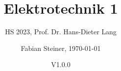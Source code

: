 \documentclass[fontsize=8pt, a4paper, fleqn, landscape, DIV=calc]{scrartcl}
\title{\vspace{-1cm}Elektrotechnik 1}
\subtitle{HS 2023, Prof. Dr. Hans-Dieter Lang}
\author{Fabian Steiner, \today}
\date{{\small V1.0.0}}
\begin{document}
	\begin{multicols*}{2}
        \begin{minipage}{0.75\columnwidth}
		      \maketitle
        \end{minipage}
        \begin{minipage}{0.2\columnwidth}
            \begin{center}
                \quad
                \qquad    
            \end{center}
        \end{minipage}
        
        \thispagestyle{fancy}%
        \raggedcolumns
        
        
        
        
        
        
	\end{multicols*}
 
\end{document}
